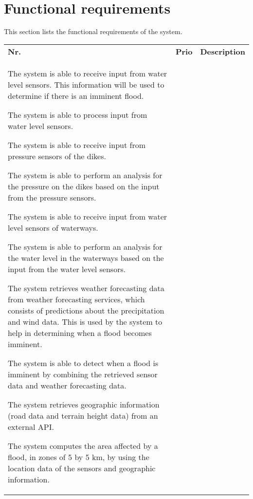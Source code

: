 \newpage
\section{Functional requirements}
This section lists the functional requirements of the system.
\begin{longtable}{L{0.1\textwidth} L{0.12\textwidth} L{0.78\textwidth}}

    \textbf{Nr.} & \textbf{Prio}  & \textbf{Description} \\
    
    {The system is able to receive input from water level sensors. This information will be used to determine if there is an imminent flood.}
    
    { The system is able to process input from water level sensors. }
    
	{The system is able to receive input from pressure sensors of the dikes.}
	
	{The system is able to perform an analysis for the pressure on the dikes based on the input from the pressure sensors.}
	
	{The system is able to receive input from water level sensors of waterways.}
	
	{The system is able to perform an analysis for the water level in the waterways based on the input from the water level sensors.}

    {The system retrieves weather forecasting data from weather forecasting services, which consists of predictions about the precipitation and wind data. This is used by the system to help in determining when a flood becomes imminent.}
     
    { The system is able to detect when a flood is imminent by combining the retrieved sensor data and weather forecasting data. }
    
    { The system retrieves geographic information (road data and terrain height data) from an external API.}
        
    { The system computes the area affected by a flood, in zones of 5 by 5 km, by using the location data of the sensors and geographic information. }
    

\end{longtable}
